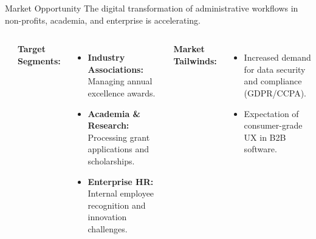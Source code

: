 \documentclass[aspectratio=169, 10pt]{beamer}
\begin{document}
\begin{frame}{Market Opportunity}
    The digital transformation of administrative workflows in non-profits, academia, and enterprise is accelerating.
    
    \vspace{0.3cm}
    \begin{columns}
        \begin{center}
        \end{center}
        
        \textbf{Target Segments:}
        \begin{itemize}
            \item \textbf{Industry Associations:} Managing annual excellence awards.
            \item \textbf{Academia \& Research:} Processing grant applications and scholarships.
            \item \textbf{Enterprise HR:} Internal employee recognition and innovation challenges.
        \end{itemize}
        \vspace{0.3cm}
        \textbf{Market Tailwinds:}
        \begin{itemize}
            \item Increased demand for data security and compliance (GDPR/CCPA).
            \item Expectation of consumer-grade UX in B2B software.
        \end{itemize}
    \end{columns}
\end{frame}
\end{document}

